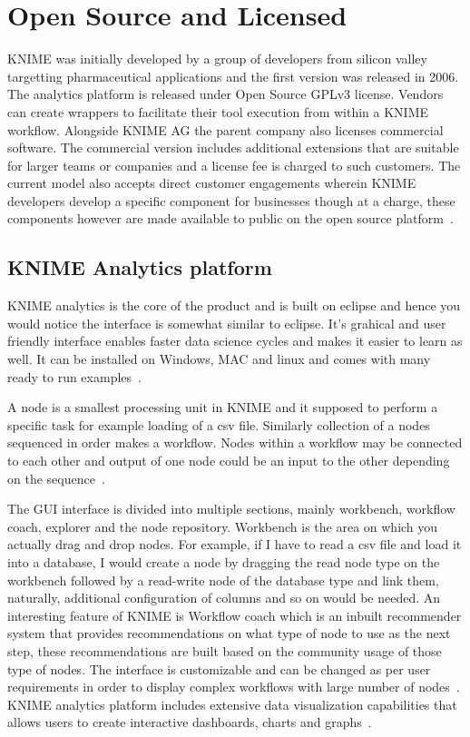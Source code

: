 \section{Open Source and Licensed}
KNIME was initially developed by a group of developers from silicon valley
targetting pharmaceutical applications and the first version was released in
2006. The analytics platform is released under Open Source GPLv3
license. Vendors can create wrappers to facilitate their tool execution from
within a KNIME workflow.  Alongside KNIME AG the parent company also licenses
commercial software. The commercial version includes additional extensions that
are suitable for larger teams or companies and a license fee is charged to such
customers. The current model also accepts direct customer engagements wherein
KNIME developers develop a specific component for businesses though at a charge,
these components however are made available to public on the open source
platform~\cite{hid-sp18-517-opensource}.

\subsection{KNIME Analytics platform}
KNIME analytics is the core of the product and is built on eclipse and hence you
would notice the interface is somewhat similar to eclipse. It's grahical and
user friendly interface enables faster data science cycles and makes it easier
to learn as well. It can be installed on Windows, MAC and linux and comes with
many ready to run examples~\cite{hid-sp18-517-kap}.

A node is a smallest processing unit in KNIME and it supposed to perform a
specific task for example loading of a csv file. Similarly collection of a nodes
sequenced in order makes a workflow. Nodes within a workflow may be connected to
each other and output of one node could be an input to the other depending on
the sequence~\cite{hid-sp18-517-kintro}.

The GUI interface is divided into multiple sections, mainly workbench, workflow
coach, explorer and the node repository. Workbench is the area on which you
actually drag and drop nodes. For example, if I have to read a csv file and load
it into a database, I would create a node by dragging the read node type on the
workbench followed by a read-write node of the database type and link them,
naturally, additional configuration of columns and so on would be needed.  An
interesting feature of KNIME is Workflow coach which is an inbuilt recommender
system that provides recommendations on what type of node to use as the next
step, these recommendations are built based on the community usage of those type
of nodes. The interface is customizable and can be changed as per user
requirements in order to display complex workflows with large number of
nodes~\cite{hid-sp18-517-ch1sec1}.  KNIME analytics platform includes extensive
data visualization capabilities that allows users to create interactive
dashboards, charts and graphs~\cite{hid-sp18-517-ch5}.

